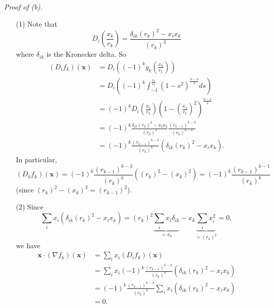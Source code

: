 \documentclass{article}
\begin{document}
\emph{Proof of (b).}
\begin{enumerate}
\item[(1)]
  Note that
  \[
    D_i \left( \frac{x_k}{r_k} \right)
    = \frac{\delta_{ik}(r_k)^2 - x_i x_k}{(r_k)^3}
  \]
  where $\delta_{ik}$ is the Kronecker delta.
  So
  \begin{align*}
    (D_i f_k)(\mathbf{x})
    &= D_i \left( (-1)^k g_k\left(\frac{x_k}{r_k}\right) \right) \\
    &= D_i \left( (-1)^k \int_{-1}^{\frac{x_k}{r_k}}(1-s^2)^{\frac{k-3}{2}} ds \right) \\
    &= (-1)^k D_i\left( \frac{x_k}{r_k} \right)
      \left(1-\left(\frac{x_k}{r_k}\right)^2 \right)^{\frac{k-3}{2}} \\
    &= (-1)^k \frac{\delta_{ik}(r_k)^2 - x_i x_k}{(r_k)^3}
      \frac{(r_{k-1})^{k-3}}{(r_k)^{k-3}} \\
    &= (-1)^k \frac{(r_{k-1})^{k-3}}{(r_k)^{k}}(\delta_{ik}(r_k)^2 - x_i x_k).
  \end{align*}
  In particular,
  \[
    (D_k f_k)(\mathbf{x})
    = (-1)^k \frac{(r_{k-1})^{k-3}}{(r_k)^{k}}((r_k)^2 - (x_k)^2)
    = (-1)^k \frac{(r_{k-1})^{k-1}}{(r_k)^{k}}
  \]
  (since $(r_k)^2 - (x_k)^2 = (r_{k-1})^2$).

\item[(2)]
  Since
  \[
    \sum_{i} x_i (\delta_{ik}(r_k)^2 - x_i x_k)
    = (r_k)^2 \underbrace{\sum_{i} x_i\delta_{ik}}_{= x_k}
      - x_k \underbrace{\sum_{i} x_i^2}_{= (r_k)^2}
    = 0,
  \]
  we have
  \begin{align*}
    \mathbf{x} \cdot (\nabla f_k)(\mathbf{x})
    &= \sum_{i} x_i (D_i f_k)(\mathbf{x}) \\
    &= \sum_{i} x_i (-1)^k \frac{(r_{k-1})^{k-3}}{(r_k)^{k}}(\delta_{ik}(r_k)^2 - x_i x_k) \\
    &= (-1)^k \frac{(r_{k-1})^{k-3}}{(r_k)^{k}} \sum_{i} x_i (\delta_{ik}(r_k)^2 - x_i x_k) \\
    &= 0.
  \end{align*}


\end{enumerate}
\end{document}
